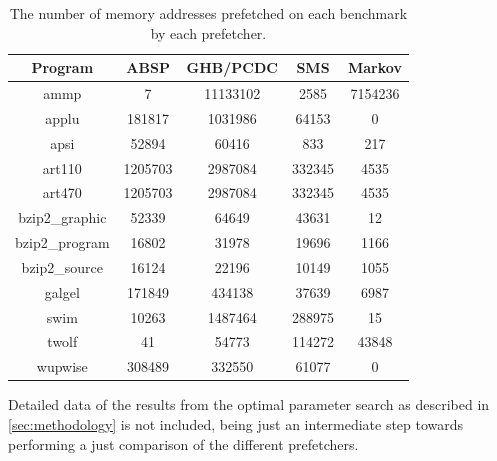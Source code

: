 \begin{table}[htbp]
  \centering
  \begin{tabular}{|c|c|c|c|c|}
    \hline
    \textbf{Program} & \textbf{ABSP} & \textbf{GHB/PCDC} & \textbf{SMS} & \textbf{Markov} \\ \hline
    ammp             & 7             & 11133102          & 2585         & 7154236 \\ \hline
    applu            & 181817        & 1031986           & 64153        & 0 \\ \hline
    apsi             & 52894         & 60416             & 833          & 217 \\ \hline
    art110           & 1205703       & 2987084           & 332345       & 4535 \\ \hline
    art470           & 1205703       & 2987084           & 332345       & 4535 \\ \hline
    bzip2\_graphic   & 52339         & 64649             & 43631        & 12 \\ \hline
    bzip2\_program   & 16802         & 31978             & 19696        & 1166 \\ \hline
    bzip2\_source    & 16124         & 22196             & 10149        & 1055 \\ \hline
    galgel           & 171849        & 434138            & 37639        & 6987 \\ \hline
    swim             & 10263         & 1487464           & 288975       & 15 \\ \hline
    twolf            & 41            & 54773             & 114272       & 43848 \\ \hline
    wupwise          & 308489        & 332550            & 61077        & 0 \\ \hline
  \end{tabular}
  \caption{The number of memory addresses prefetched on each benchmark by each prefetcher.}
  \label{tab:numPrefetches}
\end{table}


Detailed data of the results from the optimal parameter search as
described in \autoref{sec:methodology} is not included, being just an
intermediate step towards performing a just comparison of the
different prefetchers.

